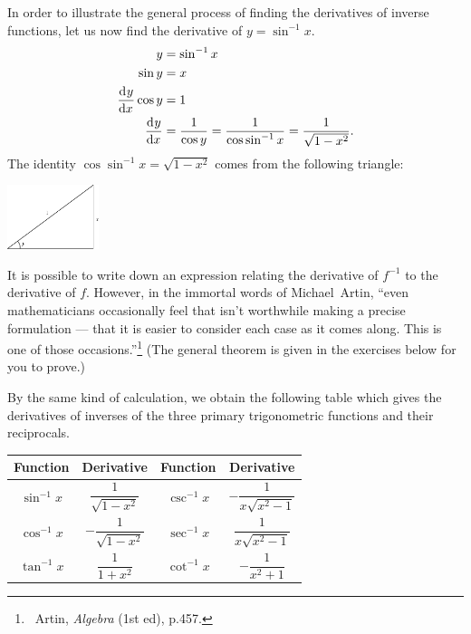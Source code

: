 In order to illustrate the general process of finding the derivatives of inverse functions, let us now find the derivative of $ y = \sin^{-1} x $.
\begin{align*}
  y &= \sin^{-1} x\\
  \sin y &= x\\
  \dod{y}{x} \cos y &= 1\\
  \dod{y}{x} &= \frac{1}{\cos y} = \frac{1}{\cos \sin^{-1} x} = \frac{1}{\sqrt{1 - x^2}}.
\end{align*}
The identity $ \cos\sin^{-1} x = \sqrt{1 - x^2} $ comes from the following triangle:
\begin{center}
  \includegraphics[width=0.2\textwidth]{antitriangle}
\end{center}

It is possible to write down an expression relating the derivative of $ f^{-1} $ to the derivative of $ f $. However, in the immortal words of
Michael~Artin, ``even mathematicians occasionally feel that isn't worthwhile making a precise formulation --- that it is easier to consider each
case as it comes along. This is one of those occasions.''\footnote{~Artin, \textit{Algebra} (1st ed), p.457.} (The general theorem is given in
the exercises below for you to prove.)

\clearpage
By the same kind of calculation, we obtain the following table which gives the derivatives of inverses of the three primary trigonometric
functions and their reciprocals.
\begin{center}
  \def\arraystretch{1.8}
  \begin{tabular}{|c|c|c|c|}\hline
    \textbf{Function} & \textbf{Derivative} &
    \textbf{Function} & \textbf{Derivative}\\\hline
    $ \sin^{-1} x $ & $ \dfrac{1}{\sqrt{1 - x^2}} $ &
    $ \csc^{-1} x $ & $ -\dfrac{1}{x\sqrt{x^2 - 1}} $ \\\hline
    $ \cos^{-1} x $ & $ -\dfrac{1}{\sqrt{1 - x^2}} $ &
    $ \sec^{-1} x $ & $ \dfrac{1}{x\sqrt{x^2 - 1}} $\\\hline
    $ \tan^{-1} x $ & $ \dfrac{1}{1+x^2} $ &
    $ \cot^{-1} x $ & $ -\dfrac{1}{x^2 + 1}$\\\hline
  \end{tabular}
\end{center}

